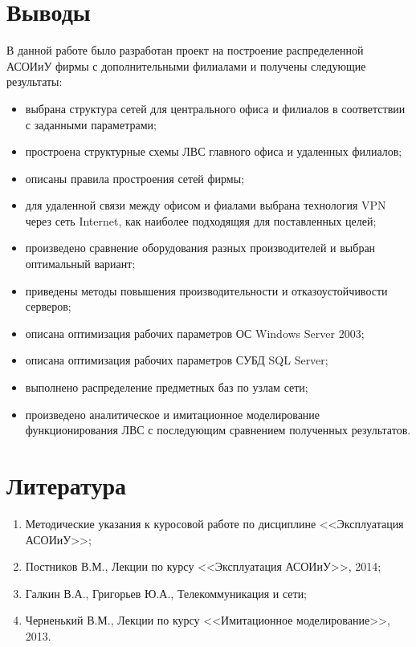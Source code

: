 \documentclass[russian,utf8,emptystyle]{eskdtext}
\begin{document}
\clearpage
\section{Выводы}

В данной работе было разработан проект на построение распределенной АСОИиУ фирмы с дополнительными филиалами и получены следующие результаты:
\begin{itemize}[label=-]
\item выбрана структура сетей для центрального офиса и филиалов в соответствии с заданными параметрами;
\item простроена структурные схемы ЛВС главного офиса и удаленных филиалов;
\item описаны правила простроения сетей фирмы;
\item для удаленной связи между офисом и фиалами выбрана технология VPN через сеть Internet, как наиболее подходящяя для поставленных целей;
\item произведено сравнение оборудования разных производителей и выбран оптимальный вариант;
\item приведены методы повышения производительности и отказоустойчивости серверов;
\item описана оптимизация рабочих параметров ОС Windows Server 2003;
\item описана оптимизация рабочих параметров СУБД SQL Server;
\item выполнено распределение предметных баз по узлам сети;
\item произведено аналитическое и имитационное моделирование функционирования ЛВС с последующим сравнением полученных результатов.
\end{itemize}

\clearpage
\section{Литература}
\begin{enumerate}[label=\arabic*)]
\item Методические указания к куросовой работе по дисциплине <<Эксплуатация АСОИиУ>>;
\item Постников В.М., Лекции по курсу <<Эксплуатация АСОИиУ>>, 2014;
\item Галкин В.А., Григорьев Ю.А., Телекоммуникация и сети;
\item Черненький В.М., Лекции по курсу <<Имитационное моделирование>>, 2013.
\end{enumerate}
\end{document}
